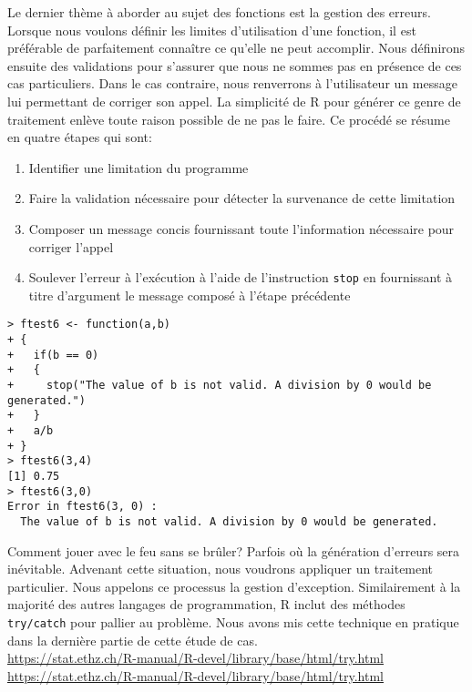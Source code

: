 \vspace{\baselineskip}
Le dernier thème à aborder au sujet des fonctions est la gestion des erreurs. Lorsque nous voulons définir les limites d'utilisation d'une fonction, il est préférable de parfaitement connaître ce qu'elle ne peut accomplir. Nous définirons ensuite des validations pour s'assurer que nous ne sommes pas en présence de ces cas particuliers. Dans le cas contraire, nous renverrons à l'utilisateur un message lui permettant de corriger son appel. La simplicité de R pour générer ce genre de traitement enlève toute raison possible de ne pas le faire. Ce procédé se résume en quatre étapes qui sont:
\begin{enumerate}
	\item Identifier une limitation du programme
	\item Faire la validation nécessaire pour détecter la survenance de cette limitation
	\item Composer un message concis fournissant toute l'information nécessaire pour corriger l'appel
	\item Soulever l'erreur à l'exécution à l'aide de l'instruction \texttt{stop} en fournissant à titre d'argument le message composé à l'étape précédente
\end{enumerate}

\begin{lstlisting}[caption = Gestion des erreurs sous R,label=src:errorManagement]
> ftest6 <- function(a,b)
+ {
+   if(b == 0)
+   {
+     stop("The value of b is not valid. A division by 0 would be generated.")
+   }
+   a/b
+ }
> ftest6(3,4)
[1] 0.75
> ftest6(3,0)
Error in ftest6(3, 0) : 
  The value of b is not valid. A division by 0 would be generated.
\end{lstlisting}

\begin{moreInfo}{Comment jouer avec le feu sans se brûler?}
	Parfois où la génération d'erreurs sera inévitable. Advenant cette situation, nous voudrons appliquer un traitement particulier. Nous appelons ce processus la gestion d'exception. Similairement à la majorité des autres langages de programmation, R inclut des méthodes \texttt{try/catch} pour pallier au problème. Nous avons mis cette technique en pratique dans la dernière partie de cette étude de cas. \\
	\url{https://stat.ethz.ch/R-manual/R-devel/library/base/html/try.html} \\
	\url{https://stat.ethz.ch/R-manual/R-devel/library/base/html/try.html}
\end{moreInfo}


